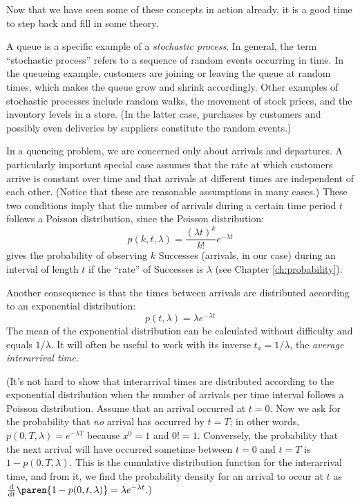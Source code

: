 Now that we have seen some of these concepts in action already, it
is a good time to step back and fill in some theory.

A queue is a specific example of a \emph{stochastic process}.  In
general, the term ``stochastic process'' refers to a sequence of
random events occurring in time. In the queueing example, customers
are joining or leaving the queue at random times, which makes the queue
grow and shrink accordingly. Other examples of stochastic processes
include random walks, the movement of stock prices, and the inventory
levels in a store.  (In the latter case, purchases by customers and
possibly even deliveries by suppliers constitute the random events.)

In a queueing problem, we are concerned only about arrivals and
departures.  A particularly important special case
 assumes that the rate at
which customers arrive is constant over time and that arrivals at
different times are independent of each other. (Notice that these are
reasonable assumptions in many cases.)  These two conditions imply
that the number of arrivals during a certain time period $t$ follows a
Poisson distribution, since the Poisson distribution:
%
\[
p(k, t, \lambda) = \frac{(\lambda t)^k}{k!} e^{-\lambda t}
\]
%
gives the probability of observing $k$ Successes (arrivals, in our
case) during an interval of length $t$ if the ``rate'' of Successes is
$\lambda$ (see Chapter \ref{ch:probability}).

Another consequence is that the times between arrivals are distributed
according to an exponential distribution:
%
\[
 p(t, \lambda) = \lambda e^{-\lambda t}
\]
%
The mean of the exponential distribution can be calculated without
difficulty and equals $1/\lambda$.  It will often be useful to work with its
inverse $t_a = 1/\lambda$, the \emph{average interarrival
  time}.

(It's not hard to show that interarrival times are distributed
according to the exponential distribution when the number of arrivals
per time interval follows a Poisson distribution. Assume that an
arrival occurred at $t=0$.  Now we ask for the probability that
\emph{no} arrival has occurred by $t=T$; in other words, $p(0, T,
\lambda) = e^{-\lambda T}$ because $x^0 = 1$ and $0! = 1$.
Conversely, the probability that the next arrival will have occurred
sometime between $t=0$ and $t=T$ is $1 - p(0,T,\lambda)$. This is the
cumulative distribution function for the interarrival time, and from
it, we find the probability density for an arrival to occur at $t$ as
$\frac{\rm d}{{\rm d}t}%
 \paren{ 1 - p(0,t,\lambda) } = \lambda e^{-\lambda t}$.)


